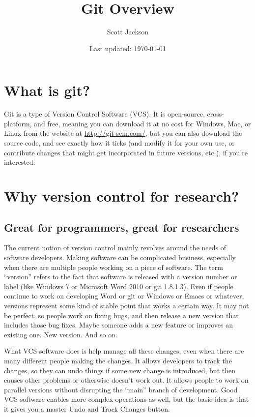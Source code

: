 \documentclass{article}
\title{Git Overview}
\author{Scott Jackson}
\date{Last updated: \today}
\begin{document}
\maketitle


\section{What is git?}
\label{sec-1}

Git is a type of Version Control Software (VCS). It is open-source, cross-platform, and free, meaning you can download it at no cost for Windows, Mac, or Linux from the website at \href{http://git-scm.com/}{http://git-scm.com/}, but you can also download the source code, and see exactly how it ticks (and modify it for your own use, or contribute changes that might get incorporated in future versions, etc.), if you're interested.
\section{Why version control for research?}
\label{sec-2}
\subsection{Great for programmers, great for researchers}
\label{sec-2-1}

The current notion of version control mainly revolves around the needs of software developers. Making software can be complicated business, especially when there are multiple people working on a piece of software.  The term ``version'' refers to the fact that software is released with a version number or label (like Windows 7 or Microsoft Word 2010 or git 1.8.1.3). Even if people continue to work on developing Word or git or Windows or Emacs or whatever, versions represent some kind of stable point that works a certain way.  It may not be perfect, so people work on fixing bugs, and then release a new version that includes those bug fixes.  Maybe someone adds a new feature or improves an existing one.  New version.  And so on.

What VCS software does is help manage all these changes, even when there are many different people making the changes. It allows developers to track the changes, so they can undo things if some new change is introduced, but then causes other problems or otherwise doesn't work out. It allows people to work on parallel versions without disrupting the ``main'' branch of development.  Good VCS software enables more complex operations as well, but the basic idea is that it gives you a master Undo and Track Changes button.
\end{document}
